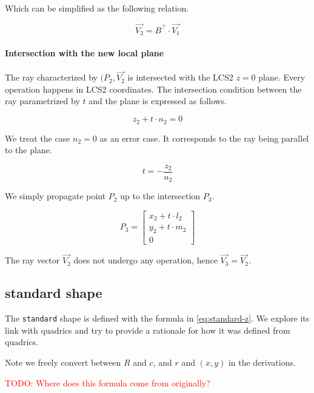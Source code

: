 Which can be simplified as the following relation.

\begin{equation}
\overrightarrow{V_2} = B^\top \cdot \overrightarrow{V_1}
\end{equation}

\paragraph{Intersection with the new local plane}
The ray characterized by $(P_2, \overrightarrow{V_2}$ is intersected
with the LCS2 $z = 0$ plane. Every operation happens in LCS2 coordinates.
The intersection condition between the ray parametrized by $t$ and the
plane is expressed as follows.

\begin{equation}
z_2 + t \cdot n_2 = 0
\end{equation}

We treat the case $n_2 = 0$ as an error case. It corresponds to the ray
being parallel to the plane.

\begin{equation}
t = - \frac{z_2}{n_2}
\end{equation}

We simply propagate point $P_2$ up to the intersection $P_3$.

\begin{equation}
P_3 = \begin{bmatrix}
x_2 + t \cdot l_2 \\
y_2 + t \cdot m_2 \\
0
\end{bmatrix}
\end{equation}

The ray vector $\overrightarrow{V_2}$ does not undergo any operation, hence
$\overrightarrow{V_3} = \overrightarrow{V_2}$.

\subsection{standard shape}
The \lstinline{standard} shape is defined with the formula in
\cref{eq:standard-z}. We explore its link with quadrics and try
to provide a rationale for how it was defined from quadrics.

Note we freely convert between $R$ and $c$, and $r$ and $(x, y)$ in
the derivations.

\textcolor{red}{TODO: Where does this formula come from originally?}

